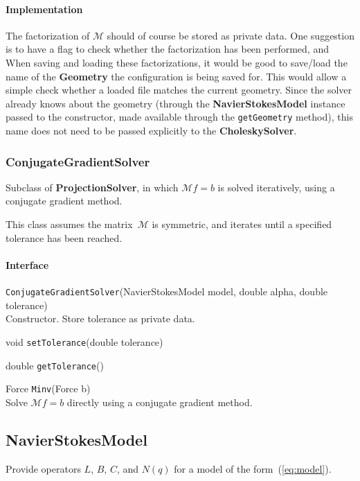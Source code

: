 \documentclass[11pt]{article}
\def\class#1{{\bf #1}} %
\def\fn#1{{\tt #1}} %
\begin{document}
\paragraph{Implementation}
The factorization of $\mathcal{M}$ should of course be stored as private data.  One suggestion is to have a flag to check whether the factorization has been performed, and When saving and loading these factorizations, it would be good to save/load the name of the \class{Geometry} the configuration is being saved for.  This would allow a simple check whether a loaded file matches the current geometry.  Since the solver already knows about the geometry (through the \class{NavierStokesModel} instance passed to the constructor, made available through the \fn{getGeometry} method), this name does not need to be passed explicitly to the \class{CholeskySolver}.

\subsubsection{ConjugateGradientSolver}
Subclass of \class{ProjectionSolver}, in which $\mathcal{M}f=b$ is solved iteratively, using a conjugate gradient method.

This class assumes the matrix~$\mathcal{M}$ is symmetric, and iterates until a specified tolerance has been reached.

\paragraph{Interface}
\begin{description}
	\item \fn{ConjugateGradientSolver}(NavierStokesModel model, double alpha, double tolerance)\\
		Constructor.  Store tolerance as private data.
	\item void \fn{setTolerance}(double tolerance)
	\item double \fn{getTolerance}()
	\item Force \fn{Minv}(Force b)\\
		Solve $\mathcal{M}f = b$ directly using a conjugate gradient method.
\end{description}


\subsection{NavierStokesModel}
Provide operators $L$, $B$, $C$, and $N(q)$ for a model of the form~(\ref{eq:model}).
\end{document}
